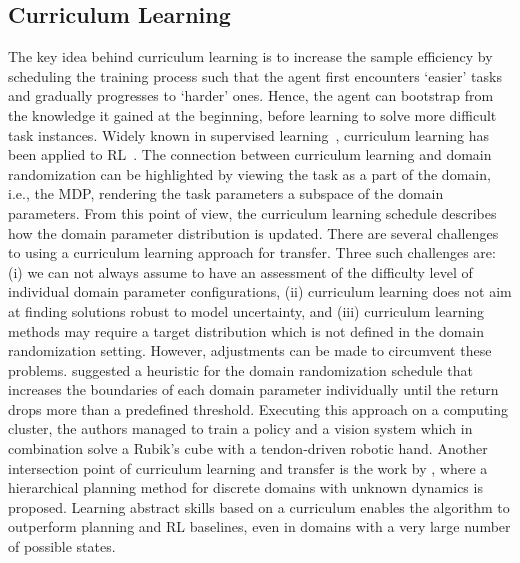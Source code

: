\documentclass[utf8]{frontiersSCNS} %
\begin{document}
\subsection{Curriculum Learning}
\label{sec_sota_curriculum_learning}
The key idea behind curriculum learning is to increase the sample efficiency by scheduling the training process such that the agent first encounters \enquote*{easier} tasks and gradually progresses to \enquote*{harder} ones.
Hence, the agent can bootstrap from the knowledge it gained at the beginning, before learning to solve more difficult task instances.
Widely known in supervised learning~\citep{Bengio_Weston_09,Kumar_Koller_10}, curriculum learning has been applied to \ac{RL}~\citep{Asada_Hosoda_96,Erez_Smart_08,Klink_Peters_19,Klink_Pajarinen_21}.
The connection between curriculum learning and domain randomization can be highlighted by viewing the task as a part of the domain, i.e., the \ac{MDP}, rendering the task parameters a subspace of the domain parameters.
From this point of view, the curriculum learning schedule describes how the domain parameter distribution is updated. 
There are several challenges to using a curriculum learning approach for \simtoreal transfer.
Three such challenges are: (i) we can not always assume to have an assessment of the difficulty level of individual domain parameter configurations, (ii) curriculum learning does not aim at finding solutions robust to model uncertainty, and (iii) curriculum learning methods may require a target distribution which is not defined in the domain randomization setting.
However, adjustments can be made to circumvent these problems. %
\citet{OpenAI_19} suggested a heuristic for the domain randomization schedule that increases the boundaries of each domain parameter individually until the return drops more than a predefined threshold.
Executing this approach on a computing cluster, the authors managed to train a policy and a vision system which in combination solve a Rubik's cube with a tendon-driven robotic hand.
Another intersection point of curriculum learning and \simtoreal transfer is the work by \citet{Morere_Ramos_19}, where a hierarchical planning method for discrete domains with unknown dynamics is proposed.
Learning abstract skills based on a curriculum enables the algorithm to outperform planning and \ac{RL} baselines, even in domains with a very large number of possible states.
\end{document}
